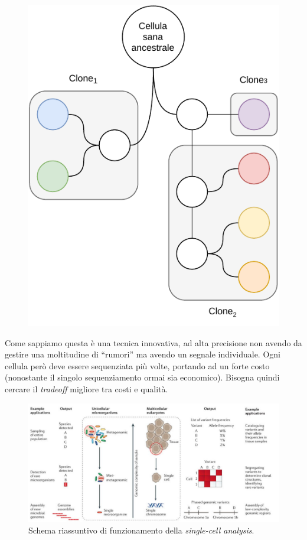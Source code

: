 \documentclass[a4paper,12pt, oneside]{book}
\begin{document}
\begin{itemize}
\begin{figure}[H]
    \includegraphics[scale = 0.7]{img/filo3.pdf}
  \end{figure}
  Come sappiamo questa è una tecnica innovativa, ad alta precisione non avendo
  da gestire una moltitudine di ``rumori'' ma avendo un segnale
  individuale. Ogni cellula però deve essere sequenziata più volte, portando ad
  un forte costo (nonostante il singolo sequenziamento ormai sia
  economico). Bisogna quindi cercare il \textit{tradeoff} migliore tra costi e
  qualità.
\end{itemize}
\begin{figure}
  \centering
  \includegraphics[scale = 0.25]{img/sca.jpg}
  \caption{Schema riassuntivo di funzionamento della \textit{single-cell
      analysis}.} 
  \label{fig:sca}
\end{figure}
\end{document}
